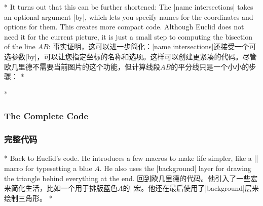 \begin{paracol}{2}
\begin{codeexample}[preamble={\usetikzlibrary{intersections,through}}]
\end{codeexample}
\switchcolumn[0]*%
It turns out that this can be further shortened: The |name intersections| takes
an optional argument |by|, which lets you specify names for the coordinates and
options for them. This creates more compact code. Although Euclid does not need
it for the current picture, it is just a small step to computing the bisection
of the line $AB$:
\switchcolumn
事实证明，这可以进一步简化：|name intersections|还接受一个可选参数|by|，可以让您指定坐标的名称和选项。这样可以创建更紧凑的代码。尽管欧几里德不需要当前图片的这个功能，但计算线段$AB$的平分线只是一个小小的步骤：
\switchcolumn[1]*%
\begin{codeexample}[preamble={\usetikzlibrary{intersections,through}}]
\end{codeexample}


\switchcolumn[0]*%
\subsubsection{The Complete Code}
\switchcolumn
\subsubsection{完整代码}
\switchcolumn[0]*%
Back to Euclid's code. He introduces a few macros to make life simpler, like a
|\A| macro for typesetting a blue $A$. He also uses the |background| layer for
drawing the triangle behind everything at the end.
\switchcolumn
回到欧几里德的代码。他引入了一些宏来简化生活，比如一个用于排版蓝色$A$的|\A|宏。他还在最后使用了|background|层来绘制三角形。
\switchcolumn[1]*%
\begin{codeexample}[pre={\pgfmathsetseed{1}},preamble={\usetikzlibrary{backgrounds,calc,intersections,through}}]
\end{codeexample}
\end{paracol}
